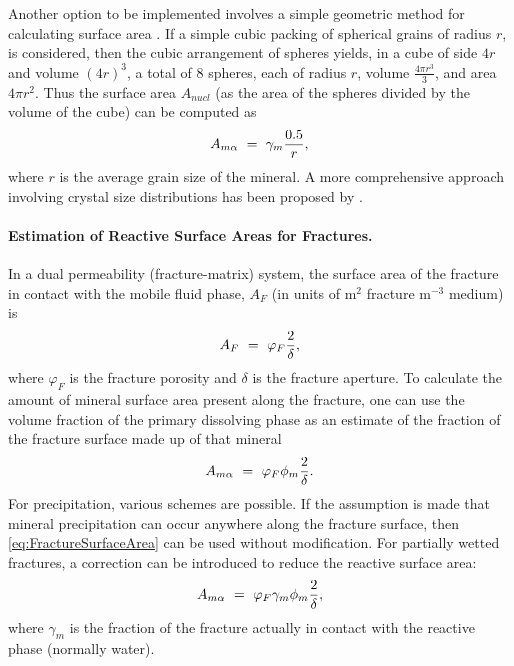 Another option to be implemented involves a simple geometric method
for calculating surface area \citep{lasaga_1984}. If a simple cubic
packing of spherical grains of radius $r$, is considered, then the
cubic arrangement of spheres yields, in a cube of side $4r$ and volume
$(4r)^3$, a total of 8 spheres, each of radius $r$, volume 
$\frac{4\pi r^3}{3}$, and area $4\pi r^2$.  Thus the surface area 
$A_{nucl}$ (as the area of the spheres divided by the volume of the
cube) can be computed as
%
\begin{equation}
  A_{m{\alpha}} \ =\  \gamma_{m} \frac{0.5}{r} ,         
  \label{eq:RSA:5}
\end{equation} 
%
where $r$ is the average grain size of the mineral.  A more
comprehensive approach involving crystal size distributions has been
proposed by \citet{steefel1990new}.

\paragraph{Estimation of Reactive Surface Areas for Fractures.}
%
In a dual permeability (fracture-matrix) system, the surface area of
the fracture in contact with the mobile fluid phase, $A_F$ (in units
of m$^2$ fracture m$^{-3}$ medium) is \citep{steefel-1994}
%
\begin{equation}
  A_F \ =\  \varphi_{F} \frac{2}{\delta},
 \label{eq:FractureSurfaceArea} 
\end{equation}
where $\varphi_{F}$ is the fracture porosity and $\delta$ is the
fracture aperture.  To calculate the amount of mineral surface area
present along the fracture, one can use the volume fraction of the
primary dissolving phase as an estimate of the fraction of the
fracture surface made up of that mineral
%
\begin{equation}
 A_{m{\alpha}} \ =\  \varphi_{F} \phi_{m} \frac{2}{\delta}.
 \label{eq:MineralSurfaceArea}
\end{equation}
For precipitation, various schemes are possible.  If the assumption is
made that mineral precipitation can occur anywhere along the fracture
surface, then \eqref{eq:FractureSurfaceArea} 
%
%
can be used without modification.  For partially wetted fractures, a correction can be 
introduced to reduce the reactive surface area:
%
\begin{equation} 
  A_{m{\alpha}} \ =\  \varphi_{F} \gamma_m \phi_{m} \frac{2}{\delta},
  \label{eq:WettedFractureSurfaceArea}
\end{equation}
%
where $\gamma_m$ is the fraction of the fracture actually in contact
with the reactive phase (normally water).








